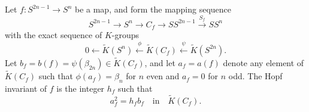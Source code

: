 Let $f: S^{2n-1} \rightarrow S^n$ be a map, and form the mapping sequence
$$S^{2n-1} \rightarrow S^n \rightarrow C_f \rightarrow S S^{2n-1} \xrightarrow{S_f} S S^n$$
with the exact sequence of $K$-groups
$$0 \leftarrow \tilde{K}(S^n) \xleftarrow{\phi} \tilde{K}(C_f) \xleftarrow{\psi} \tilde{K}(S^{2n}).$$
Let $b_f = b(f) = \psi(\beta_{2n}) \in \tilde{K}(C_f)$, and let $a_f = a(f)$ denote any element of $\tilde{K}(C_f)$ such that $\phi(a_f) = \beta_n$ for $n$ even and $a_f = 0$ for $n$ odd. The Hopf invariant of $f$ is the integer $h_f$ such that
$$a_f^2 = h_f b_f \quad \text{in} \quad \tilde{K}(C_f).$$
